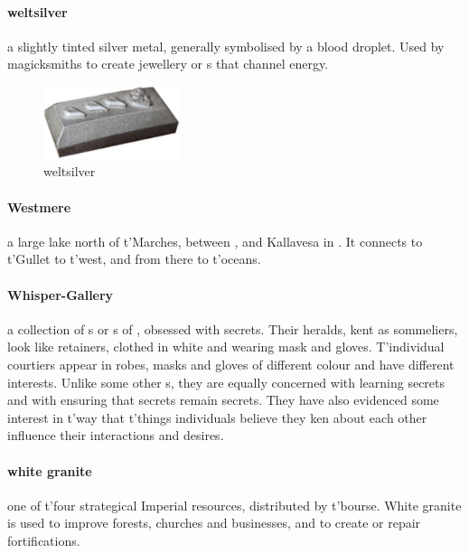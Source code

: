 \paragraph{weltsilver} a slightly tinted silver metal, generally symbolised by a blood droplet. Used by magicksmiths to create jewellery or s that channel energy.\begin{figure}\centering\includegraphics[width=4cm]{encyclopedia/weltsilver}\caption{weltsilver}\end{figure} 
\paragraph{Westmere} a large lake north of t'\allowbreak Marches, between ,  and Kallavesa in . It connects to t'\allowbreak Gullet to t'\allowbreak west, and from there to t'\allowbreak oceans.
\paragraph{Whisper-Gallery} a collection of s or s of , obsessed with secrets. Their heralds, kent as sommeliers, look like retainers, clothed in white and wearing mask and gloves. T'individual courtiers appear in robes, masks and gloves of different colour and have different interests. Unlike some other  s, they are equally concerned with learning secrets and with ensuring that secrets remain secrets. They have also evidenced some interest in t'\allowbreak way that t'\allowbreak things individuals believe they ken about each other influence their interactions and desires.
\paragraph{white granite} one of t'\allowbreak four strategical Imperial resources, distributed by t'\allowbreak bourse. White granite is used to improve forests, churches and businesses, and to create or repair fortifications.
